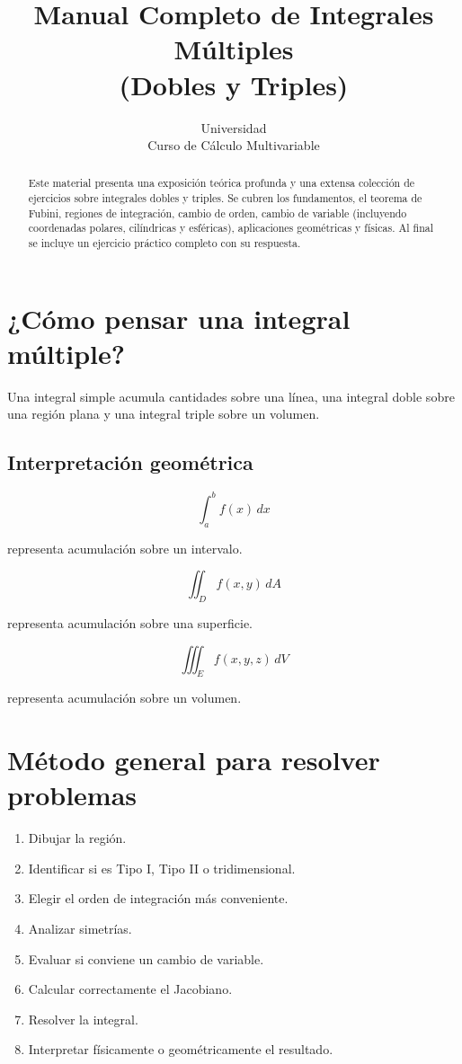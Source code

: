 \documentclass[12pt,spanish]{article}
\title{Manual Completo de Integrales Múltiples\\ (Dobles y Triples)}
\author{Universidad\\ Curso de Cálculo Multivariable}
\date{}
\begin{document}
\maketitle

\begin{abstract}
Este material presenta una exposición teórica profunda y una extensa colección de ejercicios sobre integrales dobles y triples. Se cubren los fundamentos, el teorema de Fubini, regiones de integración, cambio de orden, cambio de variable (incluyendo coordenadas polares, cilíndricas y esféricas), aplicaciones geométricas y físicas. Al final se incluye un ejercicio práctico completo con su respuesta.
\end{abstract}

\tableofcontents



\section{¿Cómo pensar una integral múltiple?}

Una integral simple acumula cantidades sobre una línea, una integral doble sobre
una región plana y una integral triple sobre un volumen.

\subsection{Interpretación geométrica}

\[
\int_a^b f(x)\,dx
\]

representa acumulación sobre un intervalo.

\[
\iint_D f(x,y)\,dA
\]

representa acumulación sobre una superficie.

\[
\iiint_E f(x,y,z)\,dV
\]

representa acumulación sobre un volumen.

\section{Método general para resolver problemas}

\begin{enumerate}
\item Dibujar la región.
\item Identificar si es Tipo I, Tipo II o tridimensional.
\item Elegir el orden de integración más conveniente.
\item Analizar simetrías.
\item Evaluar si conviene un cambio de variable.
\item Calcular correctamente el Jacobiano.
\item Resolver la integral.
\item Interpretar físicamente o geométricamente el resultado.
\end{enumerate}
\end{document}
